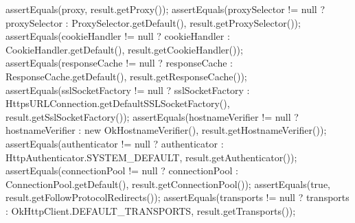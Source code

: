 \begin{response}
{{        assertEquals(proxy, result.getProxy());
        assertEquals(proxySelector != null ? proxySelector : ProxySelector.getDefault(), result.getProxySelector());
        assertEquals(cookieHandler != null ? cookieHandler : CookieHandler.getDefault(), result.getCookieHandler());
        assertEquals(responseCache != null ? responseCache : ResponseCache.getDefault(), result.getResponseCache());
        assertEquals(sslSocketFactory != null ? sslSocketFactory : HttpsURLConnection.getDefaultSSLSocketFactory(), result.getSslSocketFactory());
        assertEquals(hostnameVerifier != null ? hostnameVerifier : new OkHostnameVerifier(), result.getHostnameVerifier());
        assertEquals(authenticator != null ? authenticator : HttpAuthenticator.SYSTEM_DEFAULT, result.getAuthenticator());
        assertEquals(connectionPool != null ? connectionPool : ConnectionPool.getDefault(), result.getConnectionPool());
        assertEquals(true, result.getFollowProtocolRedirects());
        assertEquals(transports != null ? transports : OkHttpClient.DEFAULT_TRANSPORTS, result.getTransports());
    }
}
\end{response}

